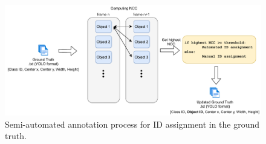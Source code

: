 \begin{figure}[!tb]
  \centering
  \includegraphics[width=1.0\linewidth]{img/annotation.pdf}
  \caption[Semi-automated annotation process for ID assignment in the ground truth]
  {Semi-automated annotation process for ID assignment in the ground truth.}
  \label{fig:annotation}
\end{figure}